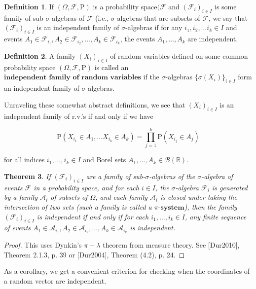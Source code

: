 \documentclass[11pt]{report}
\providecommand{\cal}{\mathcal}
\newcommand{\R}{\mathbb{R}}
\theoremstyle{plain}
\newtheorem{thm}{Theorem}[chapter]
\theoremstyle{definition}
\newtheorem{defn}[thm]{Definition}
\begin{document}
\begin{defn}
If $(\Omega, {\cal F}, \mathrm{P})$ is a probability
space$({\cal F}$ and $({\cal F}_i)_{i\in I}$ is some
family of sub-$\sigma$-algebras of ${\cal F}$ (i.e.,
$\sigma$-algebras that are subsets of ${\cal F}$, we
say that $({\cal F}_i)_{i\in I}$ is an independent
family of $\sigma$-algebras if for any
$i_1,i_2,\ldots i_k\in I$ and events
$A_1 \in {\cal F}_{i_1}, A_2 \in {\cal F}_{i_2},
\ldots, A_k \in {\cal F}_{i_k}$,
the events $A_1,\ldots,A_k$ are independent.
\end{defn}

\begin{defn}
A family $(X_i)_{i\in I}$ of random variables defined
on some common probability space
$(\Omega, {\cal F}, \mathrm{P})$ is called an
$\textbf{independent family of random variables}$ if
the $\sigma$-algebras $\{ \sigma(X_i) \}_{i\in I}$
form an independent family of $\sigma$-algebras.
\end{defn}

Unraveling these somewhat abstract definitions, we
see that $(X_i)_{i\in I}$ is an independent family of
r.v.'s if and only if we have

\[
\mathrm{P}(X_{i_1} \in A_1, \ldots X_{i_k} \in A_k) = \prod_{j=1}^k \mathrm{P}(X_{i_j} \in A_j)
\]

for all indices $i_1,\ldots,i_k \in I$ and Borel
sets $A_1,\ldots, A_k \in {\cal B}(\R)$.

\begin{thm}
If $({\cal F}_i)_{i\in I}$ are a family of
sub-$\sigma$-algebras of the $\sigma$-algebra of
events ${\cal F}$ in a probability space, and for
each $i\in I$, the $\sigma$-algebra ${\cal F}_i$ is
generated by a family ${\cal A}_i$ of subsets of
$\Omega$, and each family ${\cal A}_i$ is closed
under taking the intersection of two sets (such a
family is called a $\textbf{$\pi$-system}$), then the
family $({\cal F}_i)_{i\in I}$ is independent if and
only if for each $i_1,\ldots,i_k\in I$, any finite
sequence of events
$A_1 \in {\cal A}_{i_1}, A_2\in {\cal A}_{i_2},
\ldots, A_k \in {\cal A}_{i_k}$
is independent.
\end{thm}

\begin{proof}
This uses Dynkin's $\pi-\lambda$ theorem from measure
theory. See [Dur2010], Theorem 2.1.3, p. 39 or
[Dur2004], Theorem (4.2), p. 24.
\end{proof}

As a corollary, we get a convenient criterion for
checking when the coordinates of a random vector are
independent.
\end{document}
